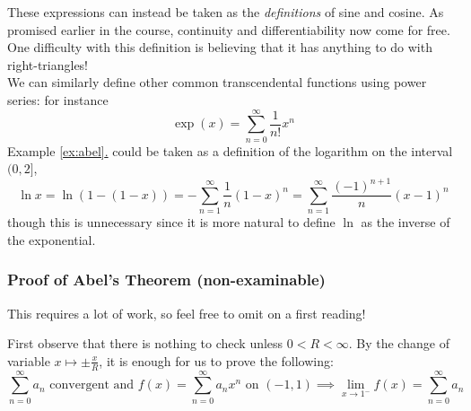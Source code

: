 These expressions can instead be taken as the \emph{definitions} of sine and cosine. As promised earlier in the course, continuity and differentiability now come for free. One difficulty with this definition is believing that it has anything to do with right-triangles!\\[5pt]
We can similarly define other common transcendental functions using power series: for instance
\[\exp(x)=\sum\limits_{n=0}^\infty \frac 1{n!}x^n %
\]
Example \hyperref[ex:abel1]{\ref*{ex:abel}.\exexabel} could be taken as a definition of the logarithm on the interval $(0,2]$, 
\[\ln x=\ln(1-(1-x))=-\sum_{n=1}^\infty \frac 1n(1-x)^n =\sum_{n=1}^\infty \frac{(-1)^{n+1}}n(x-1)^n\]
though this is unnecessary since it is more natural to define $\ln$ as the inverse of the exponential.\goodbreak


\subsubsection*{Proof of Abel's Theorem (non-examinable)}

This requires a lot of work, so feel free to omit on a first reading!\bigbreak

First observe that there is nothing to check unless $0<R<\infty$. By the change of variable $x\mapsto \pm\frac xR$, it is enough for us to prove the following:
\[\sum\limits_{n=0}^\infty a_n\text{ convergent and } f(x)=\sum\limits_{n=0}^\infty a_nx^n\text{ on }(-1,1)\implies\lim\limits_{x\to 1^-}f(x)=\sum\limits_{n=0}^\infty a_n\]

